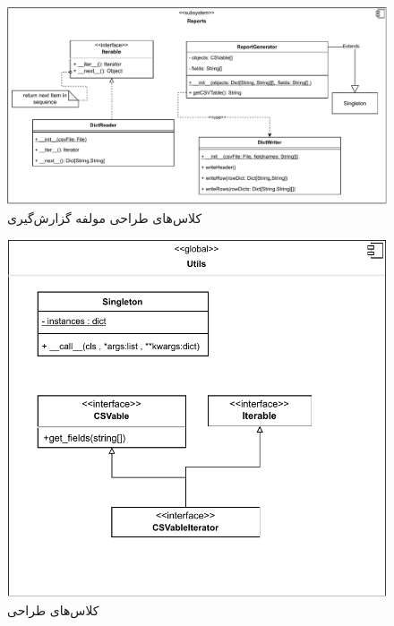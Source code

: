 \eject  \pdfpagewidth=10in \pdfpageheight=10in

\begin{figure}[ht!]
	\centering
	\includegraphics[scale=0.8]{figs/design-class/reports.pdf}
	\caption{کلاس‌های طراحی مولفه گزارش‌گیری}
\end{figure}
\FloatBarrier
\newpage

\recalctypearea

\begin{figure}[ht!]
	\centering
	\includegraphics[scale=0.8]{figs/design-class/utils.pdf}
	\caption{کلاس‌های طراحی }
\end{figure}
\FloatBarrier
\newpage

